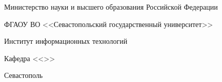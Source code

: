 \begin{titlepage}
    \pagestyle{empty}
    \setlength\parindent{0pt}

    \begin{center}
        Министерство науки и высшего образования Российской Федерации

        ФГАОУ ВО <<Севастопольский государственный университет>>

        Институт информационных технологий
    \end{center}

    \bigskip
    \bigskip

    \begin{flushright}
        Кафедра <<\department{}>>
    \end{flushright}

    \bigskip
    \bigskip
    \bigskip

    

    \begin{center}
        \vfill
        Севастополь

        \the\year{}
    \end{center}
\end{titlepage}
